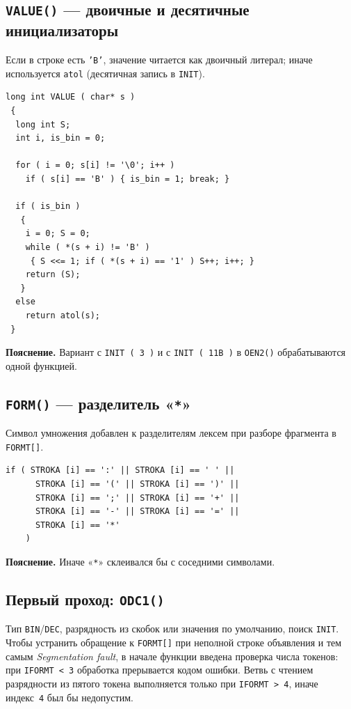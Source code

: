 \documentclass[a4paper,14pt]{extarticle}
\begin{document}
\subsection{\texttt{VALUE()} — двоичные и десятичные инициализаторы}

Если в строке есть \texttt{'B'}, значение читается как двоичный литерал; иначе
используется \texttt{atol} (десятичная запись в \texttt{INIT}).

\begin{lstlisting}[style=Cstyle,caption={Интерпретация \texttt{SYM[].INIT}},label=lst:value]
long int VALUE ( char* s )
 {
  long int S;
  int i, is_bin = 0;

  for ( i = 0; s[i] != '\0'; i++ )
    if ( s[i] == 'B' ) { is_bin = 1; break; }

  if ( is_bin )
   {
    i = 0; S = 0;
    while ( *(s + i) != 'B' )
     { S <<= 1; if ( *(s + i) == '1' ) S++; i++; }
    return (S);
   }
  else
    return atol(s);
 }
\end{lstlisting}
\textbf{Пояснение.} Вариант с \texttt{INIT ( 3 )} и с \texttt{INIT ( 11B )} в
\texttt{OEN2()} обрабатываются одной функцией.

\subsection{\texttt{FORM()} — разделитель «\texttt{*}»}

Символ умножения добавлен к разделителям лексем при разборе фрагмента в \texttt{FORMT[]}.

\begin{lstlisting}[style=Cstyle,caption={Учёт «\texttt{*}» при нарезке лексем},label=lst:form]
     if ( STROKA [i] == ':' || STROKA [i] == ' ' ||
	  STROKA [i] == '(' || STROKA [i] == ')' ||
	  STROKA [i] == ';' || STROKA [i] == '+' ||
	  STROKA [i] == '-' || STROKA [i] == '=' ||
	  STROKA [i] == '*'
	)
\end{lstlisting}
\textbf{Пояснение.} Иначе «\texttt{*}» склеивался бы с соседними символами.

\subsection{Первый проход: \texttt{ODC1()}}

Тип \texttt{BIN}/\texttt{DEC}, разрядность из скобок или значения по умолчанию,
поиск \texttt{INIT}. Чтобы устранить обращение к \texttt{FORMT[]} при неполной
строке объявления и тем самым \emph{Segmentation fault}, в начале функции введена
проверка числа токенов: при \texttt{IFORMT~<~3} обработка прерывается кодом
ошибки. Ветвь с чтением разрядности из пятого токена выполняется только при
\texttt{IFORMT~>~4}, иначе индекс~\texttt{4} был бы недопустим.
\end{document}
